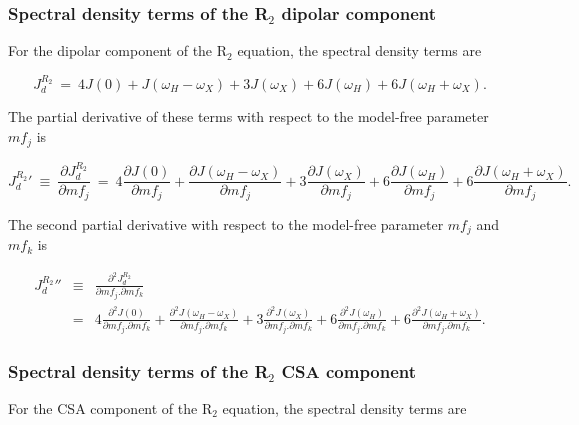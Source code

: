 \subsubsection{Spectral density terms of the R$_2$ dipolar component}

For the dipolar component of the R$_2$ equation, the spectral density terms are

\begin{equation}
    J_d^{R_2} \ = \ 4J(0) + J(\omega_H - \omega_X) + 3J(\omega_X) + 6J(\omega_H) + 6J(\omega_H + \omega_X).  \label{eq: J terms: JR2d}
\end{equation}

\noindent The partial derivative of these terms with respect to the model-free parameter $mf_j$ is

\begin{equation}
    {J_d^{R_2}}' \ \equiv \ \frac{\partial J_d^{R_2}}{\partial mf_j}
        \ = \ 4 \frac{\partial J(0)}{\partial mf_j}
        + \frac{\partial J(\omega_H - \omega_X)}{\partial mf_j}
        + 3 \frac{\partial J(\omega_X)}{\partial mf_j}
        + 6 \frac{\partial J(\omega_H)}{\partial mf_j}
        + 6 \frac{\partial J(\omega_H + \omega_X)}{\partial mf_j}.  \label{eq: J terms: JR2d'}
\end{equation}

\noindent The second partial derivative with respect to the model-free parameter $mf_j$ and $mf_k$ is

\begin{eqnarray}
    {J_d^{R_2}}'' & \equiv & \frac{\partial^2 J_d^{R_2}}{\partial mf_j . \partial mf_k} \nonumber\\
        & = & 4 \frac{\partial^2 J(0)}{\partial mf_j . \partial mf_k}
        + \frac{\partial^2 J(\omega_H - \omega_X)}{\partial mf_j . \partial mf_k}
        + 3 \frac{\partial^2 J(\omega_X)}{\partial mf_j . \partial mf_k}
        + 6 \frac{\partial^2 J(\omega_H)}{\partial mf_j . \partial mf_k}
        + 6 \frac{\partial^2 J(\omega_H + \omega_X)}{\partial mf_j . \partial mf_k}.  \label{eq: J terms: JR2d"}
\end{eqnarray}


\subsubsection{Spectral density terms of the R$_2$ CSA component}

For the CSA component of the R$_2$ equation, the spectral density terms are

